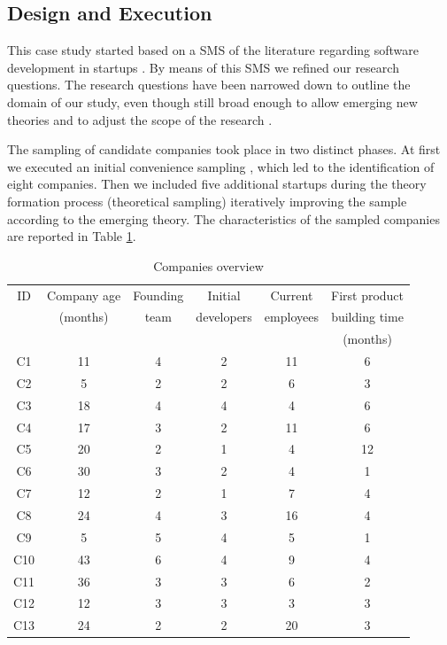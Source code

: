 \documentclass[10pt,journal,letterpaper,compsoc]{IEEEtran}
\begin{document}
\subsection{Design and Execution}
\label{desex}


This case study started based on a SMS of the literature regarding software development in startups \cite{SMS}. By means of this SMS we refined our research questions. The research questions have been narrowed down to outline the domain of our study, even though still broad enough to allow emerging new theories and to adjust the scope of the research \cite{Corbin1990}. 

The sampling of candidate companies took place in two distinct phases. At first we executed an initial convenience sampling \cite{Dawson2009}, which led to the identification of eight companies. Then we included five additional startups during the theory formation process (theoretical sampling) iteratively improving the sample according to the emerging theory. The characteristics of the sampled companies are reported in Table \ref{t_interviews-stats}. 


\begin{table}[!t]
\renewcommand{\arraystretch}{1.3}
\caption{Companies overview} 
\label{t_interviews-stats}
\centering
\begin{tabular}{|c||c||c||c||c||c|}

\hline
    ID  &  Company age & Founding & Initial & Current & First product  \\
          &   (months)   & team   & developers  & employees      &  building time    \\
                    &      & &   &  & (months)   \\
   \hline
C1    & 11    & 4     & 2     & 11    & 6   \\
C2    & 5     & 2     & 2     & 6     & 3      \\
C3    & 18    & 4     & 4     & 4     & 6      \\
C4    & 17    & 3     & 2     & 11    & 6     \\
C5    & 20    & 2     & 1     & 4     & 12   \\
C6    & 30    & 3     & 2     & 4     & 1      \\
C7    & 12    & 2     & 1     & 7     & 4      \\
C8    & 24    & 4     & 3     & 16    & 4    \\
C9    & 5     & 5     & 4     & 5     & 1     \\
C10   & 43    & 6     & 4     & 9     & 4      \\
C11   & 36    & 3     & 3     & 6     & 2     \\
C12   & 12    & 3     & 3     & 3     & 3      \\
C13   & 24    & 2     & 2     & 20    & 3     \\
 
\hline
\end{tabular}
\end{table}
\end{document}
